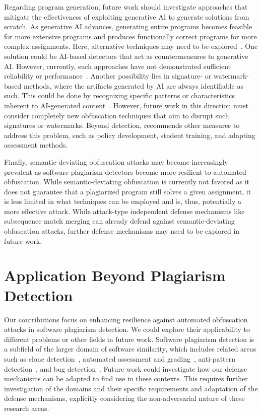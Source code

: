 Regarding program generation, future work should investigate approaches that mitigate the effectiveness of exploiting generative AI to generate solutions from scratch. As generative AI advances, generating entire programs becomes feasible for more extensive programs and produces functionally correct programs for more complex assignments.
Here, alternative techniques may need to be explored~\cite{karnalim2024, Ebrahim2024}. One solution could be AI-based detectors that act as countermeasures to generative AI. However, currently, such approaches have not demonstrated sufficient reliability or performance~\cite{WeberWulff2023, Pan2024, Khalil_Er_2023}. Another possibility lies in signature- or watermark-based methods, where the artifacts generated by AI are always identifiable as such. This could be done by recognizing specific patterns or characteristics inherent to AI-generated content~\cite{zhao2024provable, Jiang2023}. However, future work in this direction must consider completely new obfuscation techniques that aim to disrupt such signatures or watermarks.
%
Beyond detection, \citet{Lancaster2023} recommends other measures to address this problem, such as policy development, student training, and adapting assessment methods.

Finally, semantic-deviating obfuscation attacks may become increasingly prevalent as software plagiarism detectors become more resilient to automated obfuscation. While semantic-deviating obfuscation is currently not favored as it does not guarantee that a plagiarized program still solves a given assignment, it is less limited in what techniques can be employed and is, thus, potentially a more effective attack. While attack-type independent defense mechanisms like subsequence match merging can already defend against semantic-deviating obfuscation attacks, further defense mechanisms may need to be explored in future work.

\section{Application Beyond Plagiarism Detection}

Our contributions focus on enhancing resilience against automated obfuscation attacks in software plagiarism detection. We could explore their applicability to different problems or other fields in future work.
Software plagiarism detection is a subfield of the larger domain of software similarity, which includes related areas such as clone detection~\cite{Shobha2021review, ain2019, rattan2013}, automated assessment and grading~\cite{mala-mutka2005, paiva2022, higgins2005}, anti-pattern detection~\cite{palomba2014}, and bug detection~\cite{zhang2015}. Future work could investigate how our defense mechanisms can be adapted to find use in these contexts. This requires further investigation of the domains and their specific requirements and adaptation of the defense mechanisms, explicitly considering the non-adversarial nature of these research areas.

